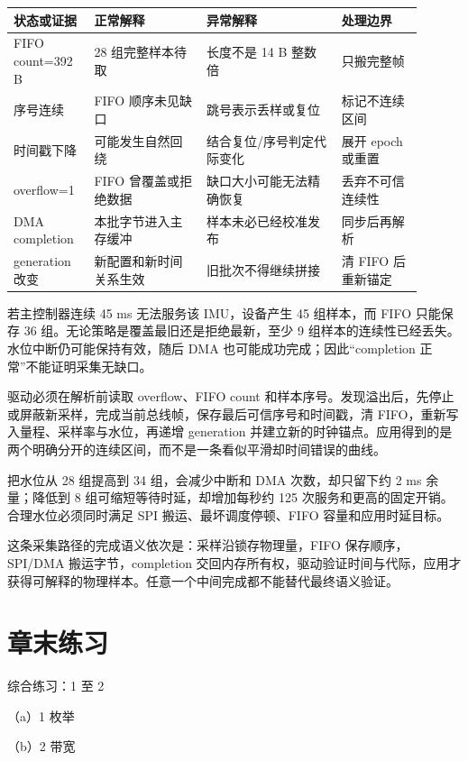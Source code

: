 \begin{longtable}{L{0.17\linewidth}L{0.25\linewidth}L{0.30\linewidth}L{0.18\linewidth}}
\toprule
状态或证据 & 正常解释 & 异常解释 & 处理边界 \\
\midrule
FIFO count=392 B & 28 组完整样本待取 & 长度不是 14 B 整数倍 & 只搬完整帧 \\\tablerowrule
序号连续 & FIFO 顺序未见缺口 & 跳号表示丢样或复位 & 标记不连续区间 \\\tablerowrule
时间戳下降 & 可能发生自然回绕 & 结合复位/序号判定代际变化 & 展开 epoch 或重置 \\\tablerowrule
overflow=1 & FIFO 曾覆盖或拒绝数据 & 缺口大小可能无法精确恢复 & 丢弃不可信连续性 \\\tablerowrule
DMA completion & 本批字节进入主存缓冲 & 样本未必已经校准发布 & 同步后再解析 \\\tablerowrule
generation 改变 & 新配置和新时间关系生效 & 旧批次不得继续拼接 & 清 FIFO 后重新锚定 \\
\bottomrule
\end{longtable}


若主控制器连续 45 ms 无法服务该 IMU，设备产生 45 组样本，而 FIFO 只能保存 36 组。无论策略是覆盖最旧还是拒绝最新，至少 9 组样本的连续性已经丢失。水位中断仍可能保持有效，随后 DMA 也可能成功完成；因此“completion 正常”不能证明采集无缺口。

驱动必须在解析前读取 overflow、FIFO count 和样本序号。发现溢出后，先停止或屏蔽新采样，完成当前总线帧，保存最后可信序号和时间戳，清 FIFO，重新写入量程、采样率与水位，再递增 generation 并建立新的时钟锚点。应用得到的是两个明确分开的连续区间，而不是一条看似平滑却时间错误的曲线。


把水位从 28 组提高到 34 组，会减少中断和 DMA 次数，却只留下约 2 ms 余量；降低到 8 组可缩短等待时延，却增加每秒约 125 次服务和更高的固定开销。合理水位必须同时满足 SPI 搬运、最坏调度停顿、FIFO 容量和应用时延目标。

这条采集路径的完成语义依次是：采样沿锁存物理量，FIFO 保存顺序，SPI/DMA 搬运字节，completion 交回内存所有权，驱动验证时间与代际，应用才获得可解释的物理样本。任意一个中间完成都不能替代最终语义验证。

\section*{章末练习}

\begin{chapterexercise}{综合练习：1 至 2}
\begin{exercisesubproblem}{（a）1}
枚举
\end{exercisesubproblem}
\begin{exercisesubproblem}{（b）2}
带宽
\end{exercisesubproblem}
\end{chapterexercise}

